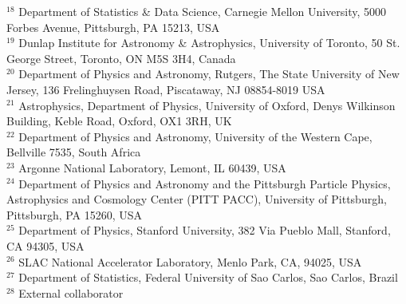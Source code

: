 \documentclass[\docopts]{\docclass}
\begin{document}
$^{18}$ Department of Statistics \& Data Science, Carnegie Mellon University, 5000 Forbes Avenue, Pittsburgh, PA 15213, USA\\
$^{19}$ Dunlap Institute for Astronomy \& Astrophysics, University of Toronto, 50 St. George Street, Toronto, ON M5S 3H4, Canada\\
$^{20}$ Department of Physics and Astronomy, Rutgers, The State University of New Jersey, 136 Frelinghuysen Road, Piscataway, NJ 08854-8019 USA\\
$^{21}$ Astrophysics, Department of Physics, University of Oxford, Denys Wilkinson Building, Keble Road, Oxford, OX1 3RH, UK\\
$^{22}$ Department of Physics and Astronomy, University of the Western Cape, Bellville 7535, South Africa\\
$^{23}$ Argonne National Laboratory, Lemont, IL 60439, USA\\
$^{24}$ Department of Physics and Astronomy and the Pittsburgh Particle Physics, Astrophysics and Cosmology Center (PITT PACC), University of Pittsburgh, Pittsburgh, PA 15260, USA\\
$^{25}$ Department of Physics, Stanford University, 382 Via Pueblo Mall, Stanford, CA 94305, USA\\
$^{26}$ SLAC National Accelerator Laboratory, Menlo Park, CA, 94025, USA\\
$^{27}$ Department of Statistics, Federal University of Sao Carlos, Sao Carlos, Brazil\\
$^{28}$ External collaborator\\
\end{document}
